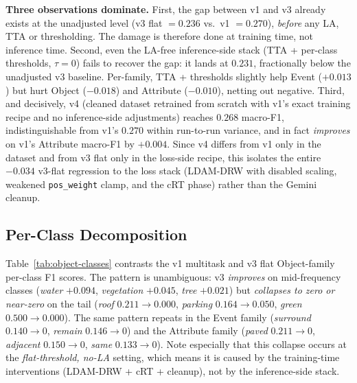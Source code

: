 \documentclass[journal]{IEEEtran}
\begin{document}
\textbf{Three observations dominate.} First, the gap between v1 and v3 already exists at the unadjusted level (v3 flat $= 0.236$ vs.\ v1 $= 0.270$), \emph{before} any LA, TTA or thresholding. The damage is therefore done at training time, not inference time. Second, even the LA-free inference-side stack (TTA + per-class thresholds, $\tau{=}0$) fails to recover the gap: it lands at $0.231$, fractionally below the unadjusted v3 baseline. Per-family, TTA + thresholds slightly help Event ($+0.013$) but hurt Object ($-0.018$) and Attribute ($-0.010$), netting out negative. Third, and decisively, v4 (cleaned dataset retrained from scratch with v1's exact training recipe and no inference-side adjustments) reaches $0.268$ macro-F1, indistinguishable from v1's $0.270$ within run-to-run variance, and in fact \emph{improves} on v1's Attribute macro-F1 by $+0.004$. Since v4 differs from v1 only in the dataset and from v3 flat only in the loss-side recipe, this isolates the entire $-0.034$ v3-flat regression to the loss stack (LDAM-DRW with disabled scaling, weakened \texttt{pos\_weight} clamp, and the cRT phase) rather than the Gemini cleanup.

\subsection{Per-Class Decomposition}\label{ssec:perclass}

Table~\ref{tab:object-classes} contrasts the v1 multitask and v3 flat Object-family per-class F1 scores. The pattern is unambiguous: v3 \emph{improves} on mid-frequency classes (\emph{water} $+0.094$, \emph{vegetation} $+0.045$, \emph{tree} $+0.021$) but \emph{collapses to zero or near-zero} on the tail (\emph{roof} $0.211\to 0.000$, \emph{parking} $0.164\to 0.050$, \emph{green} $0.500\to 0.000$). The same pattern repeats in the Event family (\emph{surround} $0.140\to 0$, \emph{remain} $0.146\to 0$) and the Attribute family (\emph{paved} $0.211\to 0$, \emph{adjacent} $0.150\to 0$, \emph{same} $0.133\to 0$). Note especially that this collapse occurs at the \emph{flat-threshold, no-LA} setting, which means it is caused by the training-time interventions (LDAM-DRW + cRT + cleanup), not by the inference-side stack.
\end{document}
